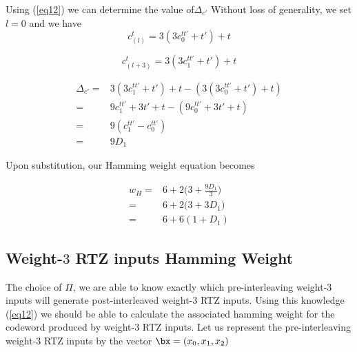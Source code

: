 \documentclass[11pt, oneside, dvipdfmx]{book}
\begin{document}
 Using  (\ref{eq12}) we can determine the  value of$\Delta_{c'}$ Without loss of generality, we set $l=0$ and we have  
 $$c_{(l)}^{t}=3(3c^{tt'}_{0}+t')+t$$
 
 $$c_{(l+3)}^{t}=3(3c^{tt'}_{1}+t')+t$$
 
 \begin{equation}
 \begin{split}
 \Delta_{c'}=& 3(3c^{tt'}_{1}+t')+t-(3(3c^{tt'}_{0}+t')+t)\\
 =&9c^{tt'}_{1}+3t'+t-(9c^{tt'}_{0}+3t'+t)\\
 =&9(c^{tt'}_{1}-c^{tt'}_{0})\\
 =&9D_1
 \end{split}
 \end{equation}
 
 Upon substitution, our Hamming weight equation becomes
 
 \begin{equation}
 \begin{split}
w_H=&6+2\Big(3+\frac{9D_1}{3}\Big)\\
=&6+2\Big(3+3D_1\Big)\\
=&6+6(1+D_1)
\end{split}
\end{equation}

\subsection{Weight-$3$ RTZ inputs Hamming Weight}
 The choice of $\Pi$, we are able to know exactly which pre-interleaving weight-$3$ inputs will generate post-interleaved weight-$3$ RTZ inputs. Using this knowledge (\ref{eq12}) we should be able to calculate the associated hamming weight for the codeword produced by weight-$3$ RTZ inputs. Let us represent the pre-interleaving  weight-$3$ RTZ inputs by the vector $\bx=(x_0,x_1,x_2)$


 
\end{document}
